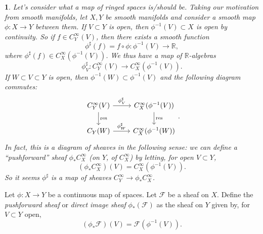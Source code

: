 \documentclass[12pt]{article}
\newtheorem{para}[theorem]{}
\begin{document}
\begin{para}
	Let's consider what a map of ringed spaces is/should be. Taking our motivation from smooth manifolds, let $X,Y$ be smooth manifolds and consider a smooth map $\phi:X\to Y$ between them. If $V\subset Y$ is open, then $\phi^{-1}(V)\subset X$ is open by continuity. So if $f\in C^\infty_Y(V)$, then there exists a smooth function 
	\begin{equation*}
		\phi^\sharp(f)=f\circ\phi:\phi^{-1}(V)\to\mathbb{R},
	\end{equation*}
	where $\phi^\sharp(f)\in C^\infty_X(\phi^{-1}(V))$. We thus have a map of $\mathbb{R}$-algebras
	\begin{equation*}
		\phi^\sharp_V: C_Y^\infty(V) \to C^\infty_X(\phi^{-1}(V)).
	\end{equation*}
	If $W\subset V\subset Y$ is open, then $\phi^{-1}(W)\subset\phi^{-1}(V)$ and the following diagram commutes:
	\begin{equation*}
\begin{tikzcd}
C^\infty_Y(V) \arrow[r, "\phi^\sharp_V"] \arrow[d, "\text{res}"] & C^\infty_X(\phi^{-1}(V)) \arrow[d, "\text{res}"] \\
C_Y(W) \arrow[r, "\phi^\sharp_W"]                                & C_X^\infty(\phi^{-1}(W))                        
\end{tikzcd}.
	\end{equation*}
	In fact, this is a diagram of sheaves in the following sense: we can define a ``pushforward'' sheaf $\phi_\ast C^\infty_X$ (on $Y$, of $C^\infty_X$) by letting, for open $V\subset Y$, 
	\begin{equation*}
		(\phi_\ast C^\infty_X)(V) = C_X^\infty(\phi^{-1}(V)).
	\end{equation*}
	So it seems $\phi^\sharp$ is a map of sheaves $C^\infty_Y\to\phi_\ast C^\infty_X$.
\end{para}

\begin{definition}
	Let $\phi:X\to Y$ be a continuous map of spaces. Let $\mathscr{F}$ be a sheaf on $X$. Define the \emph{pushforward sheaf} or \emph{direct image sheaf} $\phi_\ast(\mathscr{F})$ as the sheaf on $Y$ given by, for $V\subset Y$ open,
	\begin{equation*}
		(\phi_\ast\mathscr{F})(V)=\mathscr{F}(\phi^{-1}(V)).
	\end{equation*}
\end{definition}
\end{document}
